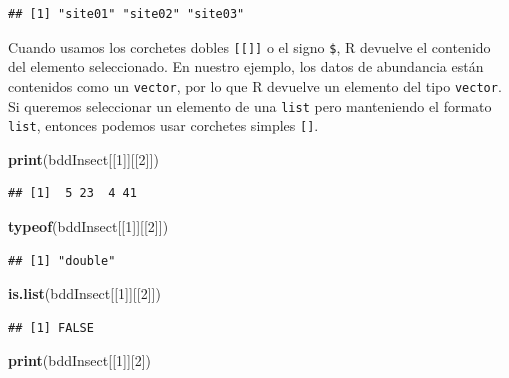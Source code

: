 \documentclass[]{book}
\newenvironment{Shaded}{\begin{snugshade}}{\end{snugshade}}
\newcommand{\KeywordTok}[1]{\textcolor[rgb]{0.13,0.29,0.53}{\textbf{#1}}}
\newcommand{\DecValTok}[1]{\textcolor[rgb]{0.00,0.00,0.81}{#1}}
\newcommand{\NormalTok}[1]{#1}
\begin{document}
\begin{verbatim}
## [1] "site01" "site02" "site03"
\end{verbatim}

Cuando usamos los corchetes dobles \texttt{{[}{[}{]}{]}} o el signo
\texttt{\$}, R devuelve el contenido del elemento seleccionado. En
nuestro ejemplo, los datos de abundancia están contenidos como un
\texttt{vector}, por lo que R devuelve un elemento del tipo
\texttt{vector}. Si queremos seleccionar un elemento de una
\texttt{list} pero manteniendo el formato \texttt{list}, entonces
podemos usar corchetes simples \texttt{{[}{]}}.

\begin{Shaded}
\begin{Highlighting}[]
\KeywordTok{print}\NormalTok{(bddInsect[[}\DecValTok{1}\NormalTok{]][[}\DecValTok{2}\NormalTok{]])}
\end{Highlighting}
\end{Shaded}

\begin{verbatim}
## [1]  5 23  4 41
\end{verbatim}

\begin{Shaded}
\begin{Highlighting}[]
\KeywordTok{typeof}\NormalTok{(bddInsect[[}\DecValTok{1}\NormalTok{]][[}\DecValTok{2}\NormalTok{]])}
\end{Highlighting}
\end{Shaded}

\begin{verbatim}
## [1] "double"
\end{verbatim}

\begin{Shaded}
\begin{Highlighting}[]
\KeywordTok{is.list}\NormalTok{(bddInsect[[}\DecValTok{1}\NormalTok{]][[}\DecValTok{2}\NormalTok{]])}
\end{Highlighting}
\end{Shaded}

\begin{verbatim}
## [1] FALSE
\end{verbatim}

\begin{Shaded}
\begin{Highlighting}[]
\KeywordTok{print}\NormalTok{(bddInsect[[}\DecValTok{1}\NormalTok{]][}\DecValTok{2}\NormalTok{])}
\end{Highlighting}
\end{Shaded}
\end{document}
